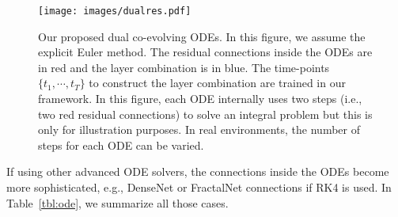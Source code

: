 \documentclass[sigconf]{acmart}
\begin{document}
\begin{figure}[]
\centering
\texttt{[image: images/dualres.pdf]}
\caption{Our proposed dual co-evolving ODEs. In this figure, we assume the explicit Euler method. The residual connections inside the ODEs are in red and the layer combination is in blue. The time-points $\{t_1, \cdots, t_T\}$ to construct the layer combination are trained in our framework. In this figure, each ODE internally uses two steps (i.e., two red residual connections) to solve an integral problem but this is only for illustration purposes. In real environments, the number of steps for each ODE can be varied.} \label{fig:dual}
\end{figure}

If using other advanced ODE solvers, the connections inside the ODEs become more sophisticated, e.g., DenseNet or FractalNet connections if RK4 is used. In Table~\ref{tbl:ode}, we summarize all those cases.
\end{document}
